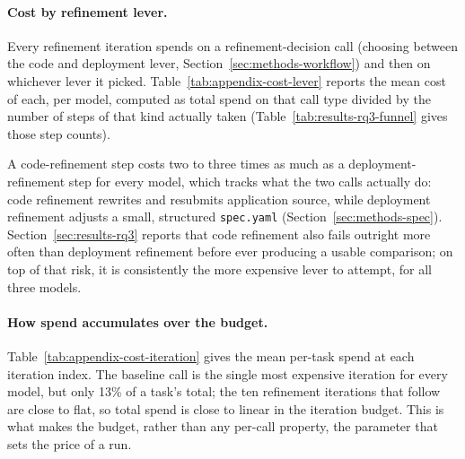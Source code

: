 \paragraph{Cost by refinement lever.} Every refinement iteration spends
on a refinement-decision call (choosing between the code and deployment
lever, Section~\ref{sec:methods-workflow}) and then on whichever lever it
picked. Table~\ref{tab:appendix-cost-lever} reports the mean cost of each,
per model, computed as total spend on that call type divided by the
number of steps of that kind actually taken (Table~\ref{tab:results-rq3-funnel}
gives those step counts).

\begin{table}[htbp]
  \centering
  \caption{Mean LLM cost (USD) per refinement-decision call, per
    code-refinement step, and per deployment-refinement step, by model.}
  \label{tab:appendix-cost-lever}
  \small
\end{table}

A code-refinement step costs two to three times as much as a
deployment-refinement step for every model, which tracks what the two calls
actually do: code refinement rewrites and resubmits application source,
while deployment refinement adjusts a small, structured \texttt{spec.yaml}
(Section~\ref{sec:methods-spec}). Section~\ref{sec:results-rq3} reports
that code refinement also fails outright more often than deployment refinement
before ever producing a usable comparison; on top of that risk, it is
consistently the more expensive lever to attempt, for all three models.

\paragraph{How spend accumulates over the budget.}
Table~\ref{tab:appendix-cost-iteration} gives the mean per-task spend at
each iteration index. The baseline call is the single most expensive
iteration for every model, but only 13\% of a task's total; the ten
refinement iterations that follow are close to flat, so total spend is
close to linear in the iteration budget. This is what makes the budget,
rather than any per-call property, the parameter that sets the price of a
run.

